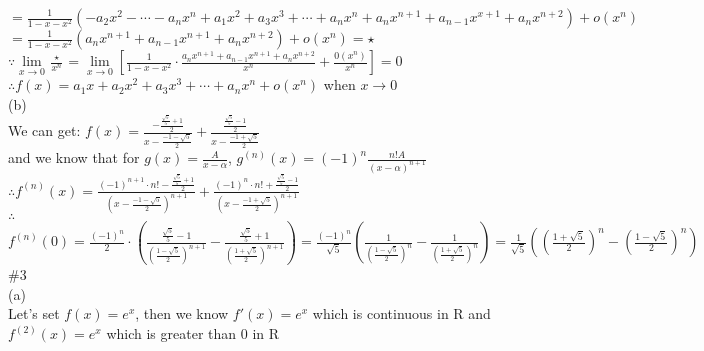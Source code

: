 \documentclass{article}
\begin{document}
\quad$=\displaystyle\frac{1}{1-x-x^2}(-a_2x^2-\cdots-a_nx^n+a_1x^2+a_3x^3+\cdots+a_nx^n+a_nx^{n+1}+a_{n-1}x^{x+1}+a_nx^{n+2})+o(x^n)$\\

\quad$=\displaystyle\frac{1}{1-x-x^2}(a_nx^{n+1}+a_{n-1}x^{n+1}+a_nx^{n+2})+o(x^n)=\star$\\

$\because$\qquad$\lim \limits_{x \to 0}\displaystyle\frac{\star}{x^n}=\lim \limits_{x \to 0}\left[\displaystyle\frac{1}{1-x-x^2}\cdot\frac{a_nx^{n+1}+a_{n-1}x^{n+1}+a_nx^{n+2}}{x^n}+\frac{0(x^n)}{x^n}\right]=0$\\

$\therefore$\qquad$f(x)=a_1x+a_2x^2+a_3x^3+\cdots+a_nx^n+o(x^n)$ when $x \to 0$\\

(b)\\

We can get: $f(x)=\displaystyle\frac{-\frac{\frac{\sqrt{5}}{5}+1}{2}}{x-\frac{-1-\sqrt{5}}{2}}+\frac{\frac{\frac{\sqrt{5}}{5}-1}{2}}{x-\frac{-1+\sqrt{5}}{2}}$\\

and we know that for $g(x)=\frac{A}{x-\alpha}$, $g^{(n)}(x)=(-1)^n\displaystyle\frac{n!A}{(x-\alpha)^{n+1}}$\\

$\therefore$\qquad$f^{(n)}(x)=\displaystyle\frac{(-1)^{n+1}\cdot n!-\frac{\frac{\sqrt{5}}{5}+1}{2}}{\left(x-\frac{-1-\sqrt{5}}{2}\right)^{n+1}}+\frac{(-1)^{n}\cdot n!+\frac{\frac{\sqrt{5}}{5}-1}{2}}{\left(x-\frac{-1+\sqrt{5}}{2}\right)^{n+1}}$\\

$\therefore$\qquad$f^{(n)}(0)=\displaystyle\frac{(-1)^n}{2}\cdot\left(\frac{\frac{\sqrt{5}}{5}-1}{\left(\frac{1-\sqrt{5}}{2}\right)^{n+1}}-\frac{\frac{\sqrt{5}}{5}+1}{\left(\frac{1+\sqrt{5}}{2}\right)^{n+1}}\right)=\frac{(-1)^n}{\sqrt{5}}\left(\frac{1}{\left(\frac{1-\sqrt{5}}{2}\right)^n}-\frac{1}{\left(\frac{1+\sqrt{5}}{2}\right)^n}\right)=\frac{1}{\sqrt{5}}\left(\left(\frac{1+\sqrt{5}}{2}\right)^n-\left(\frac{1-\sqrt{5}}{2}\right)^n\right)$\\

\textcolor[rgb]{0.00,0.00,0.50}{\#3}\\

(a)\\

Let's set $f(x)=e^x$, then we know $f'(x)=e^x$ which is continuous in R and $f^{(2)}(x)=e^x$ which is greater than $0$ in R\\
\end{document}

